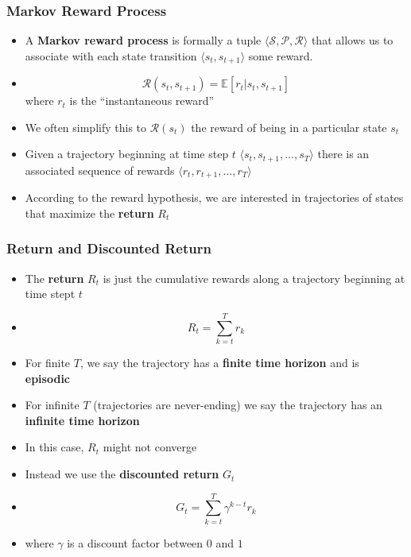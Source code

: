 \documentclass{beamer}
\begin{document}
\begin{frame}
  \frametitle{Markov Reward Process}
  \begin{itemize}
    \item A \textbf{Markov reward process} is formally a tuple $\langle \mathcal{S}, \mathcal{P}, \mathcal{R} \rangle$ that allows us to associate with each state transition $\langle s_t, s_{t+1} \rangle$ some reward.
    \item $$\mathcal{R}(s_t, s_{t+1}) = \mathbb{E} \left[r_t \vert s_t, s_{t+1} \right]$$ where $r_t$ is the ``instantaneous reward''
    \item We often simplify this to $\mathcal{R}(s_t)$ the reward of being in a particular state $s_t$
    \item Given a trajectory beginning at time step $t$ $\langle s_t, s_{t+1}, \dots, s_T \rangle$ there is an associated sequence of rewards $\langle r_t, r_{t+1}, \dots, r_T \rangle$
    \item According to the reward hypothesis, we are interested in trajectories of states that maximize the \textbf{return} $R_t$
  \end{itemize}
\end{frame}

\begin{frame}
  \frametitle{Return and Discounted Return}
  \begin{itemize}
    \item The \textbf{return} $R_t$ is just the cumulative rewards along a trajectory beginning at time stept $t$
    \item $$R_t = \sum_{k=t}^T r_k$$
    \item For finite $T$, we say the trajectory has a \textbf{finite time horizon} and is \textbf{episodic}
    \item For infinite $T$ (trajectories are never-ending) we say the trajectory has an \textbf{infinite time horizon}
    \item In this case, $R_t$ might not converge
    \item Instead we use the \textbf{discounted return} $G_t$
    \item $$G_t = \sum_{k=t}^T \gamma^{k-t}r_k$$
    \item where $\gamma$ is a discount factor between $0$ and $1$
  \end{itemize}
\end{frame}
\end{document}
